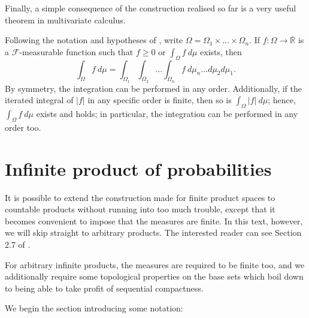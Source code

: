 Finally, a simple consequence of the construction realised so far is a very useful theorem in multivariate calculus.

\begin{corl}\label{corollary:classical Fubini's}
    Following the notation and hypotheses of , write \(\Omega=\Omega_{1}\times \dots \times \Omega_{n}\). If \(f\colon \Omega\to \overline{\mathbb{R}} \) is a \(\mathcal{F}\)-measurable function such that \(f\geq 0\) or \(\int_{\Omega}f~d\mu\) exists, then
    \begin{equation}\label{equation:classical Fubini's}
        \int_{\Omega}f~d\mu=\int_{\Omega_1}\int_{\Omega_2}\dots\int_{\Omega_n}f~d\mu_n\dots d\mu_2d\mu_1
    .\end{equation}
    By symmetry, the integration can be performed in any order.
    Additionally, if the iterated integral of \(|f|\) in any specific order is finite, then so is \(\int_{\Omega}|f|~d\mu\); hence, \(\int_{\Omega}f~d\mu\) exists and  holds; in particular, the integration can be performed in any order too.
\end{corl}
\section{Infinite product of probabilities}\label{section:infinite products}

It is possible to extend the construction made for finite product spaces to countable products without running into too much trouble, except that it becomes convenient to impose that the measures are finite. In this text, however, we will skip straight to arbitrary products. The interested reader can see Section 2.7 of \cite{ash1972real}.

For arbitrary infinite products, the measures are required to be finite too, and we additionally require some topological properties on the base sets which boil down to being able to take profit of sequential compactness.

We begin the section introducing some notation:

